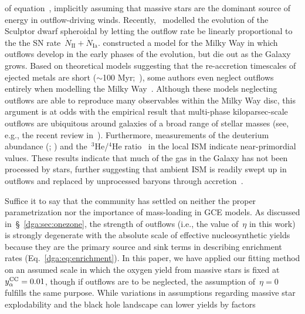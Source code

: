 of equation~, implicitly assuming that massive stars are
the dominant source of energy in outflow-driving winds.
Recently,~\citet{delosReyes2022} modelled the evolution of the Sculptor dwarf
spheroidal by letting the outflow rate be linearly proportional to the the
SN rate~$\dot{N}_\text{II} + \dot{N}_\text{Ia}$.
\citet*{Kobayashi2020} constructed a model for the Milky Way in which
outflows develop in the early phases of the evolution, but die out as the
Galaxy grows.
Based on theoretical models suggesting that the re-accretion timescales of
ejected metals are short ($\sim$100 Myr;~\citealp{Melioli2008, Melioli2009,
Spitoni2008, Spitoni2009}), some authors even neglect outflows entirely when
modelling the Milky Way~\citep[e.g.,][]{Minchev2013, Minchev2014, Minchev2017,
Spitoni2019, Spitoni2021}.
Although these models neglecting outflows are able to reproduce many
observables within the Milky Way disc, this argument is at odds with the
empirical result that multi-phase kiloparsec-scale outflows are ubiquitous
around galaxies of a broad range of stellar masses (see, e.g., the recent
review in~\citealt{Veilleux2020}).
Furthermore, measurements of the deuterium abundance (\citealp{Linsky2006};
\citealp*{Prodanovic2010}) and the~$^3$He/$^4$He ratio~\citep{Balser2018} in
the local ISM indicate near-primordial values.
These results indicate that much of the gas in the Galaxy has not been
processed by stars, further suggesting that ambient ISM is readily swept up in
outflows and replaced by unprocessed baryons through
accretion~\citep{Weinberg2017a, Cooke2022}.
\par
Suffice it to say that the community has settled on neither the proper
parametrization nor the importance of mass-loading in GCE models.
As discussed in~\S~\ref{dga:sec:onezone}, the strength of outflows (i.e., the value
of~$\eta$ in this work) is strongly degenerate with the absolute scale of
effective nucleosynthetic yields because they are the primary source and sink
terms in describing enrichment rates (Eq.~\ref{dga:eq:enrichment}).
In this paper, we have applied our fitting method on an assumed scale in which
the oxygen yield from massive stars is fixed at~$y_\alpha^\text{CC} = 0.01$, though if
outflows are to be neglected, the assumption of~$\eta = 0$ fulfills the same
purpose.
While variations in assumptions regarding massive star explodability and the
black hole landscape can lower yields by factors
